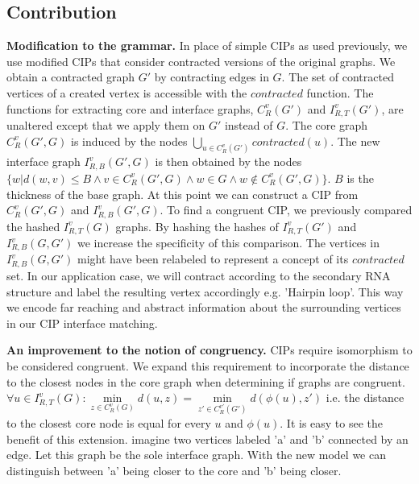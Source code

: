 \documentclass{article}
\begin{document}
\subsection{Contribution}
\textbf{Modification to the grammar.}
In place of simple CIPs as used previously,
we use modified CIPs that consider contracted versions
of the original graphs. We obtain a contracted graph $G'$ by contracting edges
in $G$. The set of contracted vertices of a
created vertex is accessible with the $contracted$ function.
The functions for extracting core and interface graphs, 
$C_{R}^v(G')$ and $I_{R,T}^v(G')$, are unaltered except that we apply them
on $G'$ instead of $G$. 
The core graph $C_{R}^v(G',G)$ is induced by the nodes 
$\bigcup\limits_{u \in C_R^v(G')} contracted(u)$.
The new interface graph $I_{R,B}^v(G',G)$ is then obtained by the nodes 
$\{ w | d(w,v) \leq B \wedge v\in C_R^v(G',G) \wedge w \in G \wedge w 
\notin C_R^v(G',G) \}$.  $B$ is the thickness of the base graph. 
At this point we can construct a CIP from $C_R^v(G',G)$ and $I_{R,B}^v(G',G)$. 
To find a congruent CIP, we previously compared the hashed $I_{R,T}^v(G)$ 
graphs. By hashing the hashes of $I_{R,T}^v(G')$ and $I_{R,B}^v(G,G')$ we 
increase the specificity of this comparison. The vertices in $I_{R,B}^v(G,G')$ 
might have been relabeled to represent a concept of its $contracted$ set. In 
our application case, we will contract according to the 
secondary RNA structure and label the resulting vertex accordingly e.g.
'Hairpin loop'. This way we encode far reaching and abstract 
information about the surrounding vertices in our CIP interface matching.


\textbf{An improvement to the notion of congruency.}
CIPs require isomorphism to be considered congruent.
We expand this requirement to incorporate
the distance to the closest nodes in the core graph when 
determining if graphs are congruent.
$\forall u \in I_{R,T}^v(G) : 
\underset{z \in  C_{R}^v(G)}{\min} d(u,z) = 
\underset{z' \in  C_{R}^{v'}(G')}{\min} d(\phi(u),z') $ i.e. the distance 
to the closest core node is equal for every
$u$ and $\phi(u)$.
It is easy to see the benefit of this extension.
imagine two vertices labeled 'a' and 'b' connected by an edge. Let this graph
be the sole interface graph. With the new model we can distinguish 
between 'a' being closer to the core and 'b' being closer. 
\end{document}
